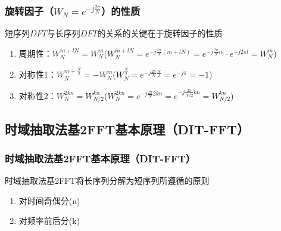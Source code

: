 \documentclass[notheorems,compress,mathserif,table]{beamer}
\newcommand{\sihao}{\fontsize{14pt}{\baselineskip}\selectfont}      %
\newcommand{\xiaosihao}{\fontsize{12pt}{\baselineskip}\selectfont}  %
\begin{document}
\begin{frame}\frametitle{旋转因子（$W_{N}=e^{-j\frac{2\pi}{N}}$）的性质}
\par 短序列$DFT$与长序列$DFT$的关系的关键在于旋转因子的性质
\newline

\begin{enumerate}
    \item 周期性：$W_{N}^{m+lN}=W_{N}^{m}$\quad($W_{N}^{m+lN}= e^{-j\frac{2\pi}{N}(m+lN)} = e^{-j\frac{2\pi}{N}m}\cdot e^{-j 2\pi l}=W_{N}^{m}$)\newline
    \item 对称性1：$W_{N}^{m+\frac{N}{2}}= -W_{N}^{m}$\quad\quad($W_{N}^{\frac{N}{2}}= e^{-j\frac{2\pi}{N}\frac{N}{2}}= e^{-j\pi}=-1$)\newline
    \item 对称性2：$W_{N}^{2kn}= W_{N/2}^{kn}$\quad\quad($W_{N}^{2kn}= e^{-j\frac{2\pi}{N}2kn}= e^{-j\frac{2\pi}{N/2}kn} =W_{N/2}^{kn} $)
\end{enumerate}
\end{frame}


\subsection{时域抽取法基2FFT基本原理（DIT-FFT）}
\begin{frame}[shrink]\frametitle{时域抽取法基2FFT基本原理（DIT-FFT）}
时域抽取法基2FFT将长序列分解为短序列所遵循的原则
\begin{enumerate}
     \item 对时间奇偶分(n)
     \item 对频率前后分(k)
\end{enumerate}



\end{frame}

\end{document}
